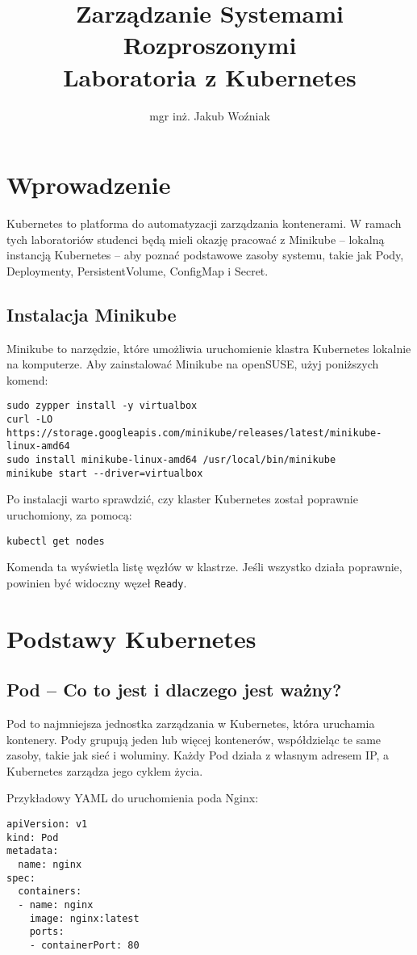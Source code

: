 \documentclass{article}
\title{Zarządzanie Systemami Rozproszonymi\\Laboratoria z Kubernetes}
\author{mgr inż. Jakub Woźniak}
\date{}
\begin{document}
\maketitle

\section{Wprowadzenie}
Kubernetes to platforma do automatyzacji zarządzania kontenerami. W ramach tych laboratoriów studenci będą mieli okazję pracować z Minikube – lokalną instancją Kubernetes – aby poznać podstawowe zasoby systemu, takie jak Pody, Deploymenty, PersistentVolume, ConfigMap i Secret.

\subsection{Instalacja Minikube}
Minikube to narzędzie, które umożliwia uruchomienie klastra Kubernetes lokalnie na komputerze. Aby zainstalować Minikube na openSUSE, użyj poniższych komend:
\begin{lstlisting}
sudo zypper install -y virtualbox
curl -LO https://storage.googleapis.com/minikube/releases/latest/minikube-linux-amd64
sudo install minikube-linux-amd64 /usr/local/bin/minikube
minikube start --driver=virtualbox
\end{lstlisting}

Po instalacji warto sprawdzić, czy klaster Kubernetes został poprawnie uruchomiony, za pomocą:
\begin{lstlisting}
kubectl get nodes
\end{lstlisting}
Komenda ta wyświetla listę węzłów w klastrze. Jeśli wszystko działa poprawnie, powinien być widoczny węzeł \texttt{Ready}.

\section{Podstawy Kubernetes}

\subsection{Pod – Co to jest i dlaczego jest ważny?}
Pod to najmniejsza jednostka zarządzania w Kubernetes, która uruchamia kontenery. Pody grupują jeden lub więcej kontenerów, współdzieląc te same zasoby, takie jak sieć i woluminy. Każdy Pod działa z własnym adresem IP, a Kubernetes zarządza jego cyklem życia.

Przykładowy YAML do uruchomienia poda Nginx:
\begin{lstlisting}
apiVersion: v1
kind: Pod
metadata:
  name: nginx
spec:
  containers:
  - name: nginx
    image: nginx:latest
    ports:
    - containerPort: 80
\end{lstlisting}
\end{document}
